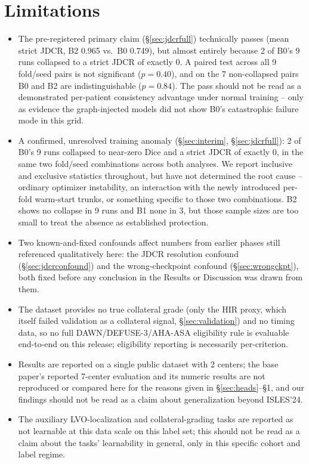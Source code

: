 \documentclass[conference]{IEEEtran}
\begin{document}
\section{Limitations}
\begin{itemize}
\item The pre-registered primary claim (\S\ref{sec:jdcrfull}) technically passes (mean strict JDCR, B2 0.965 vs.\ B0 0.749), but almost entirely because 2 of B0's 9 runs collapsed to a strict JDCR of exactly 0. A paired test across all 9 fold/seed pairs is not significant ($p=0.40$), and on the 7 non-collapsed pairs B0 and B2 are indistinguishable ($p=0.84$). The pass should not be read as a demonstrated per-patient consistency advantage under normal training -- only as evidence the graph-injected models did not show B0's catastrophic failure mode in this grid.
\item A confirmed, unresolved training anomaly (\S\ref{sec:interim}, \S\ref{sec:jdcrfull}): 2 of B0's 9 runs collapsed to near-zero Dice and a strict JDCR of exactly 0, in the same two fold/seed combinations across both analyses. We report inclusive and exclusive statistics throughout, but have not determined the root cause -- ordinary optimizer instability, an interaction with the newly introduced per-fold warm-start trunks, or something specific to those two combinations. B2 shows no collapse in 9 runs and B1 none in 3, but those sample sizes are too small to treat the absence as established protection.
\item Two known-and-fixed confounds affect numbers from earlier phases still referenced qualitatively here: the JDCR resolution confound (\S\ref{sec:jdcrconfound}) and the wrong-checkpoint confound (\S\ref{sec:wrongckpt}), both fixed before any conclusion in the Results or Discussion was drawn from them.
\item The dataset provides no true collateral grade (only the HIR proxy, which itself failed validation as a collateral signal, \S\ref{sec:validation}) and no timing data, so no full DAWN/DEFUSE-3/AHA-ASA eligibility rule is evaluable end-to-end on this release; eligibility reporting is necessarily per-criterion.
\item Results are reported on a single public dataset with 2 centers; the base paper's reported 7-center evaluation and its numeric results are not reproduced or compared here for the reasons given in \S\ref{sec:heads}--\S1, and our findings should not be read as a claim about generalization beyond ISLES'24.
\item The auxiliary LVO-localization and collateral-grading tasks are reported as not learnable at this data scale on this label set; this should not be read as a claim about the tasks' learnability in general, only in this specific cohort and label regime.

\end{itemize}
\end{document}
